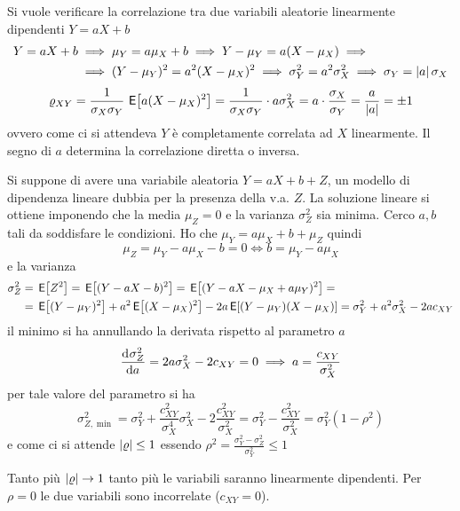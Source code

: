 \begin{esempio}
Si vuole verificare la correlazione tra due variabili aleatorie linearmente dipendenti $Y=a X+b$
\[
	\begin{split}
		Y=a X+b&\implies\mu_Y=a\mu_X+b\implies Y-\mu_Y=a(X-\mu_X)\implies\\
		&\implies(Y-\mu_Y)^2=a^2(X-\mu_X)^2\implies\sigma^2_Y=a^2\sigma^2_X\implies\sigma_Y=\left|{a}\right|\sigma_X
	\end{split}
\]
\[
	\varrho_{XY}=\frac{1}{\sigma_X\sigma_Y}\,\,{\operatorname{\mathsf{E}}}\!\left[{a(X-\mu_X)^2}\right]=\frac{1}{\sigma_X\sigma_Y}\cdot a\sigma^2_X=a\cdot\frac{\sigma_X}{\sigma_Y}=\frac{a}{\left|{a}\right|}=\pm 1
\]
ovvero come ci si attendeva $Y$ è completamente correlata ad $X$ linearmente. Il segno di $a$ determina la correlazione diretta o inversa.
\end{esempio}

\begin{esempio}
Si suppone di avere una variabile aleatoria $Y=a X+b+Z$, un modello di dipendenza lineare dubbia per la presenza della v.a. $Z$. La soluzione lineare si ottiene imponendo che la media $\mu_Z=0$ e la varianza $\sigma^2_Z$ sia minima. Cerco $a,b$ tali da soddisfare le condizioni.
Ho che $\mu_Y=a\mu_X+b+\mu_Z$ quindi
\[
	\mu_Z=\mu_Y-a\mu_X-b=0\iff b=\mu_Y-a\mu_X
\]
e la varianza
\[
	\begin{split}
		\sigma^2_Z&=\,{\operatorname{\mathsf{E}}}\!\left[{Z^2}\right]=\,{\operatorname{\mathsf{E}}}\!\left[{(Y-a X-b)^2}\right]=\,{\operatorname{\mathsf{E}}}\!\left[{(Y-a X-\mu_X+a\mu_Y)^2}\right]=\\
		&=\,{\operatorname{\mathsf{E}}}\!\left[{(Y-\mu_Y)^2}\right]+a^2 \,{\operatorname{\mathsf{E}}}\!\left[{(X-\mu_X)^2}\right]-2a \,{\operatorname{\mathsf{E}}}\!\left[{(Y-\mu_Y)(X-\mu_X)}\right]=\sigma^2_Y+a^2\sigma^2_X-2a c_{XY}
	\end{split}
\]
il minimo si ha annullando la derivata rispetto al parametro $a$
\[
	\dfrac{\mathop{}\!\mathrm{d}^{}\sigma^2_Z}{\mathop{}\!\mathrm{d} a^{}}=2a\sigma^2_X-2c_{XY}=0 \implies a=\frac{c_{XY}}{\sigma^2_X}
\]
per tale valore del parametro si ha
\[
	\sigma^2_{Z,\min}=\sigma^2_Y+\frac{c^2_{XY}}{\sigma^4_X}\sigma^2_X-2\frac{c^2_{XY}}{\sigma^2_X}=\sigma^2_Y-\frac{c^2_{XY}}{\sigma^2_X}=\sigma^2_Y(1-\rho^2)
\]
e come ci si attende $\left|{\varrho}\right|\leq 1$ essendo $\rho^2=\frac{\sigma^2_Y-\sigma^2_Z}{\sigma^2_Y}\leq 1$

Tanto più $\left|{\varrho}\right|\to 1$ tanto più le variabili saranno linearmente dipendenti. Per $\rho=0$ le due variabili sono incorrelate ($c_{XY}=0$).
\end{esempio}


